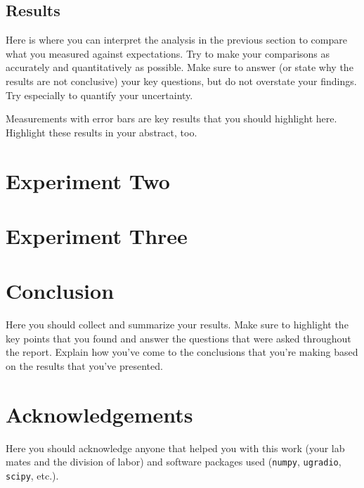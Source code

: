 \documentclass[12pt,preprint]{aastex}
\begin{document}
\subsection{Results}

Here is where you can interpret the analysis in the previous section
to compare what you measured against expectations. Try to make your
comparisons as accurately and quantitatively as possible. Make sure
to answer (or state why the results are not conclusive) your key
questions, but 
do not overstate your findings. Try especially to quantify your
uncertainty.

Measurements with error bars are key results that you should highlight
here. Highlight these results in your abstract, too.

\section{Experiment Two}
\label{experiment2}

\section{Experiment Three}
\label{experiment3}

\section{Conclusion}
\label{conclusion}

Here you should collect and summarize your results. Make sure to highlight the
key points that you found and answer the questions that were asked throughout
the report. Explain how you’ve come to the conclusions that you’re making based
on the results that you’ve presented.

\section*{Acknowledgements}

Here you should acknowledge anyone that helped you with this work (your lab
mates and the division of labor) and software packages used (\texttt{numpy},
\texttt{ugradio}, \texttt{scipy}, etc.). 
\end{document}

